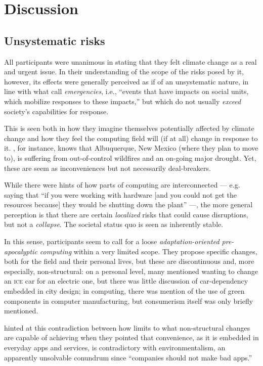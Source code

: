 \section{Discussion}

\subsection{Unsystematic risks}

All participants were unanimous in stating that they felt climate change as a real and urgent issue. In their understanding of the scope of the risks posed by it, however, its effects were generally perceived as if of an unsystematic nature, in line with what \citeauthor{silberman2010precarious} call \emph{emergencies}, i.e., ``events that have impacts on social units, which mobilize responses to these impacts,'' but which do not usually \emph{exceed} society's capabilities for response.

This is seen both in how they imagine themselves potentially affected by climate change and how they feel the computing field will (if at all) change in response to it. , for instance, knows that Albuquerque, New Mexico (where they plan to move to), is suffering from out-of-control wildfires and an on-going major drought. Yet, these are seem as inconveniences but not necessarily deal-breakers.

While there were hints of how parts of computing are interconnected --- e.g.  saying that ``if you were working with hardware [and you could not get the resources because] they would be shutting down the plant'' ---, the more general perception is that there are certain \emph{localized} risks that could cause disruptions, but not a \emph{collapse}. The societal status quo is seen as inherently stable.

In this sense, participants seem to call for a loose \emph{adaptation-oriented pre-apocalyptic computing} within a very limited scope. They propose specific changes, both for the field and their personal lives, but these are discontinuous and, more especially, non-structural: on a personal level, many mentioned wanting to change an \textsc{ice} car for an electric one, but there was little discussion of car-dependency embedded in city design; in computing, there was mention of the use of green components in computer manufacturing, but consumerism itself was only briefly mentioned.

 hinted at this contradiction between how limits to what non-structural changes are capable of achieving when they pointed that convenience, as it is embedded in everyday apps and services, is contradictory with environmentalism, an apparently unsolvable conundrum since ``companies should not make bad apps.''


